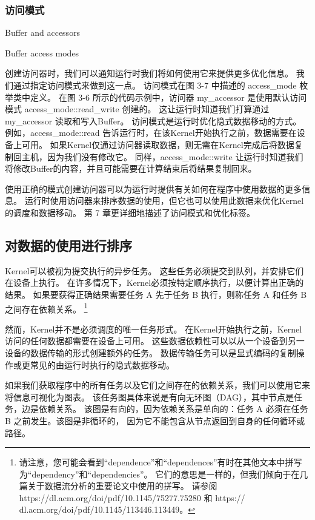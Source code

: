 \subsubsection{访问模式}
{\color{red} Buffer and accessors }

{\color{red} Buffer access modes}

创建访问器时，我们可以通知运行时我们将如何使用它来提供更多优化信息。 我们通过指定访问模式来做到这一点。 
访问模式在图 3-7 中描述的 access\_mode 枚举类中定义。 
在图 3-6 所示的代码示例中，访问器 my\_accessor 是使用默认访问模式 access\_mode::read\_write 创建的。 
这让运行时知道我们打算通过 my\_accessor 读取和写入Buffer。 访问模式是运行时优化隐式数据移动的方式。 
例如，access\_mode::read 告诉运行时，在该Kernel开始执行之前，数据需要在设备上可用。 
如果Kernel仅通过访问器读取数据，则无需在Kernel完成后将数据复制回主机，因为我们没有修改它。 
同样，access\_mode::write 让运行时知道我们将修改Buffer的内容，并且可能需要在计算结束后将结果复制回来。

使用正确的模式创建访问器可以为运行时提供有关如何在程序中使用数据的更多信息。 
运行时使用访问器来排序数据的使用，但它也可以使用此数据来优化Kernel的调度和数据移动。 
第 7 章更详细地描述了访问模式和优化标签。

\subsection{对数据的使用进行排序}
Kernel可以被视为提交执行的异步任务。 这些任务必须提交到队列，并安排它们在设备上执行。 
在许多情况下，Kernel必须按特定顺序执行，以便计算出正确的结果。 
如果要获得正确结果需要任务 A 先于任务 B 执行，则称任务 A 和任务 B 之间存在依赖关系。
\footnote{请注意，您可能会看到“dependence”和“dependences”有时在其他文本中拼写为“dependency”和“dependencies”。
它们的意思是一样的，但我们倾向于在几篇关于数据流分析的重要论文中使用的拼写。
请参阅 https://dl.acm.org/doi/pdf/10.1145/75277.75280 
和 https:// dl.acm.org/doi/pdf/10.1145/113446.113449。}

然而，Kernel并不是必须调度的唯一任务形式。 在Kernel开始执行之前，Kernel访问的任何数据都需要在设备上可用。 
这些数据依赖性可以以从一个设备到另一设备的数据传输的形式创建额外的任务。 
数据传输任务可以是显式编码的复制操作或更常见的由运行时执行的隐式数据移动。

如果我们获取程序中的所有任务以及它们之间存在的依赖关系，我们可以使用它来将信息可视化为图表。 
该任务图具体来说是有向无环图（DAG），其中节点是任务，边是依赖关系。 
该图是有向的，因为依赖关系是单向的：任务 A 必须在任务 B 之前发生。该图是非循环的，
因为它不能包含从节点返回到自身的任何循环或路径。

